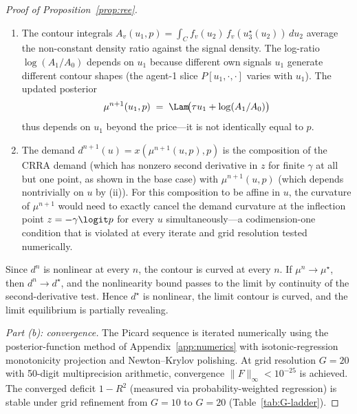 \begin{proof}[Proof of Proposition~\ref{prop:ree}]
\begin{enumerate}[label=(\roman*),topsep=2pt,itemsep=2pt]
\item The contour integrals
$A_{v}(u_{1},p)=\int_{C}f_{v}(u_{2})\,f_{v}(u_{3}^{\star}(u_{2}))\,du_{2}$
average the non-constant density ratio against the signal density. The
log-ratio $\log(A_{1}/A_{0})$ depends on $u_{1}$ because different own
signals $u_{1}$ generate different contour shapes (the agent-1 slice
$P[u_{1},\cdot,\cdot]$ varies with $u_{1}$). The updated posterior
\[
   \mu^{n+1}(u_{1},p) \;=\; \Lam\!\bigl(\tau u_{1}+\log(A_{1}/A_{0})\bigr)
\]
thus depends on $u_{1}$ beyond the price---it is not identically equal
to $p$.

\item The demand $d^{n+1}(u)=x(\mu^{n+1}(u,p),p)$ is the composition of
the CRRA demand (which has nonzero second derivative in $z$ for finite
$\gamma$ at all but one point, as shown in the base case) with
$\mu^{n+1}(u,p)$ (which depends nontrivially on $u$ by (ii)). For this
composition to be affine in $u$, the curvature of $\mu^{n+1}$ would need
to exactly cancel the demand curvature at the inflection point
$z=-\gamma\logit p$ for every $u$ simultaneously---a codimension-one
condition that is violated at every iterate and grid resolution tested
numerically.
\end{enumerate}

Since $d^{n}$ is nonlinear at every $n$, the contour is curved at every
$n$. If $\mu^{n}\to\mu^{\star}$, then $d^{n}\to d^{\star}$, and the
nonlinearity bound passes to the limit by continuity of the
second-derivative test. Hence $d^{\star}$ is nonlinear, the limit
contour is curved, and the limit equilibrium is partially revealing.

\emph{Part (b): convergence.} The Picard sequence is iterated
numerically using the posterior-function method of
Appendix~\ref{app:numerics} with isotonic-regression monotonicity
projection and Newton--Krylov polishing. At grid resolution $G=20$
with 50-digit multiprecision arithmetic, convergence
$\|F\|_{\infty}<10^{-25}$ is achieved. The converged deficit $1-R^{2}$
(measured via probability-weighted regression) is stable under grid
refinement from $G=10$ to $G=20$
(Table~\ref{tab:G-ladder}).
\end{proof}

